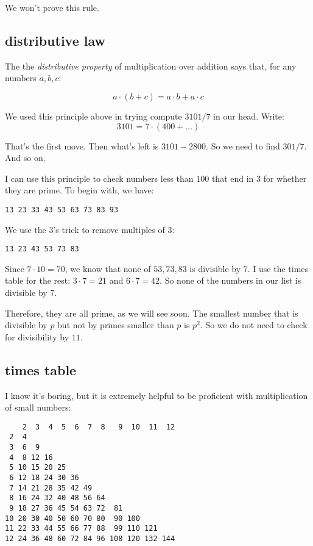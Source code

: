 \documentclass[11pt, oneside]{article}
\begin{document}
We won't prove this rule.

\subsection*{distributive law}

The the \emph{distributive property} of multiplication over addition says that, for any numbers $a,b,c$:

\[ a \cdot (b+c) = a \cdot b + a \cdot c \]

We used this principle above in trying compute $3101/7$ in our head.  Write:
\[ 3101 = 7 \cdot (400 + \dots) \]

That's the first move.  Then what's left is $3101 - 2800$.  So we need to find $301/7$.  And so on.

I can use this principle to check numbers less than $100$ that end in $3$ for whether they are prime.  To begin with, we have:

\begin{verbatim}
13 23 33 43 53 63 73 83 93
\end{verbatim}

We use the $3$'s trick to remove multiples of $3$:

\begin{verbatim}
13 23 43 53 73 83
\end{verbatim}

Since $7 \cdot 10 = 70$, we know that none of $53, 73, 83$ is divisible by $7$.  I use the times table for the rest:  $3 \cdot 7 = 21$ and $6 \cdot 7 = 42$.  So none of the numbers in our list is divisible by $7$. 

Therefore, they are all prime, as we will see soon.  The smallest number that is divisible by $p$ but not by primes smaller than $p$ is $p^2$.  So we do not need to check for divisibility by $11$.

\subsection*{times table}

I know it's boring, but it is extremely helpful to be proficient with multiplication of small numbers:

\begin{verbatim}
    2  3  4  5  6  7  8   9  10  11  12
 2  4
 3  6  9
 4  8 12 16
 5 10 15 20 25
 6 12 18 24 30 36
 7 14 21 28 35 42 49
 8 16 24 32 40 48 56 64
 9 18 27 36 45 54 63 72  81
10 20 30 40 50 60 70 80  90 100
11 22 33 44 55 66 77 88  99 110 121
12 24 36 48 60 72 84 96 108 120 132 144
\end{verbatim}
\end{document}
